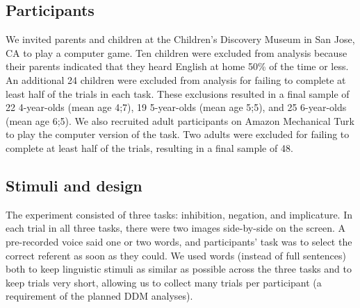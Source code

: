 \documentclass[10pt,letterpaper]{article}
\newcommand{\aen}[1]{\textcolor{DarkOrange}{[aen: #1]}}
\begin{document}

\subsection{Participants}

We invited parents and children at the Children's Discovery Museum in San Jose, CA to play a computer game. Ten children were excluded from analysis because their parents indicated that they heard English at home 50\% of the time or less. An additional 24 children were excluded from analysis for failing to complete at least half of the trials in each task. These exclusions resulted in a final sample of 22 4-year-olds (mean age 4;7), 19 5-year-olds (mean age 5;5), and 25 6-year-olds (mean age 6;5). We also recruited adult participants on Amazon Mechanical Turk to play the computer version of the task. Two adults were excluded for failing to complete at least half of the trials, resulting in a final sample of 48.

\subsection{Stimuli and design}

The experiment consisted of three tasks: inhibition, negation, and implicature. In each trial in all three tasks, there were two images side-by-side on the screen. A pre-recorded voice said one or two words, and participants' task was to select the correct referent as soon as they could. We used words (instead of full sentences) both to keep linguistic stimuli as similar as possible across the three tasks and to keep trials very short, allowing us to collect many trials per participant (a requirement of the planned DDM analyses).
\end{document}

